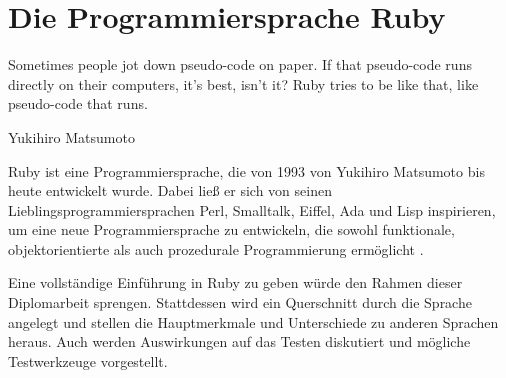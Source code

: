 \chapter{Die Programmiersprache Ruby}
\label{sec:ruby}
\epigraph{Sometimes people jot down pseudo-code on paper. If that pseudo-code runs directly on their computers, it's best, isn't it? Ruby tries to be like that, like pseudo-code that runs.}{Yukihiro Matsumoto}

Ruby ist eine Programmiersprache, die von 1993 von Yukihiro Matsumoto bis heute entwickelt wurde. Dabei ließ er sich von seinen Lieblingsprogrammiersprachen Perl, Smalltalk, Eiffel, Ada und Lisp inspirieren, um eine neue Programmiersprache zu entwickeln, die sowohl funktionale, objektorientierte als auch prozedurale Programmierung ermöglicht \citep{ruby_visual_identity_team_about_2011}.

Eine vollständige Einführung in Ruby zu geben würde den Rahmen dieser Diplomarbeit sprengen. Stattdessen wird ein Querschnitt durch die Sprache angelegt und stellen die Hauptmerkmale und Unterschiede zu anderen Sprachen heraus. Auch werden Auswirkungen auf das Testen diskutiert und mögliche Testwerkzeuge vorgestellt.

